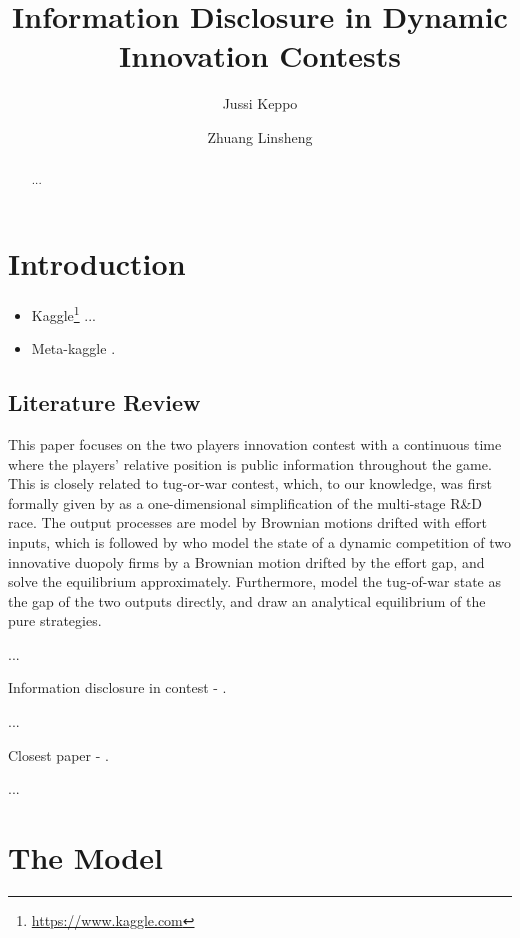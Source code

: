 \documentclass[a4paper, 11pt]{article}
\title{Information Disclosure in Dynamic Innovation Contests}
\author{Jussi Keppo \and Zhuang Linsheng}
\date{}
\theoremstyle{plain} %
\begin{document}
\maketitle

\begin{abstract}
...
\end{abstract}

\section{Introduction}

\begin{itemize}
\item Kaggle\footnote{\url{https://www.kaggle.com}} ...
\item Meta-kaggle \cite{megan_risdal_timo_bozsolik_2022}. 
\end{itemize}

\subsection{Literature Review}

This paper focuses on the two players innovation contest with a continuous time  where the players’ relative position is public information throughout the game.
This is closely related to tug-or-war contest, which, to our knowledge, was first formally given by \citet{Harris1987Race} as a one-dimensional simplification of the multi-stage R\&D race. 
The output processes are model by Brownian motions drifted with effort inputs, which is followed by \cite{budd1993model} who model the state of a dynamic competition of two innovative duopoly firms by a Brownian motion drifted by the effort gap, and solve the equilibrium approximately. 
Furthermore, \citet{Moscarini2007Contest} model the tug-of-war state as the gap of the two outputs directly, and draw an analytical equilibrium of the pure strategies. 

...

Information disclosure in contest - \cite{Bimpikis2019Contest}. 

...

Closest paper - \cite{ryvkin2022fight}.

...




\section{The Model}
\end{document}
